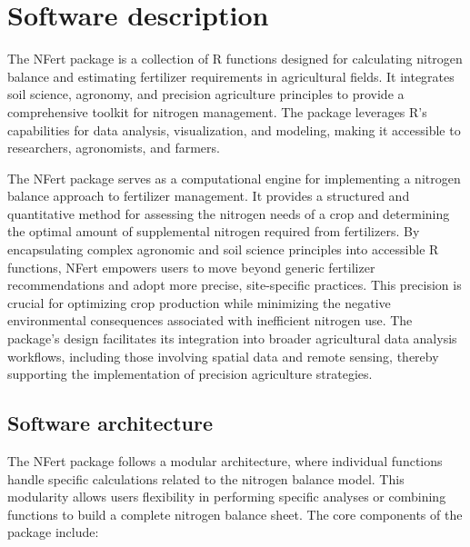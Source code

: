 \documentclass[
  11pt,
]{article}
\begin{document}
\section{Software description}\label{software-description}

The NFert package is a collection of R functions designed for
calculating nitrogen balance and estimating fertilizer requirements in
agricultural fields. It integrates soil science, agronomy, and precision
agriculture principles to provide a comprehensive toolkit for nitrogen
management. The package leverages R's capabilities for data analysis,
visualization, and modeling, making it accessible to researchers,
agronomists, and farmers.

The NFert package serves as a computational engine for implementing a
nitrogen balance approach to fertilizer management. It provides a
structured and quantitative method for assessing the nitrogen needs of a
crop and determining the optimal amount of supplemental nitrogen
required from fertilizers. By encapsulating complex agronomic and soil
science principles into accessible R functions, NFert empowers users to
move beyond generic fertilizer recommendations and adopt more precise,
site-specific practices. This precision is crucial for optimizing crop
production while minimizing the negative environmental consequences
associated with inefficient nitrogen use. The package's design
facilitates its integration into broader agricultural data analysis
workflows, including those involving spatial data and remote sensing,
thereby supporting the implementation of precision agriculture
strategies.

\subsection{Software architecture}\label{software-architecture}

The NFert package follows a modular architecture, where individual
functions handle specific calculations related to the nitrogen balance
model. This modularity allows users flexibility in performing specific
analyses or combining functions to build a complete nitrogen balance
sheet. The core components of the package include:
\end{document}
